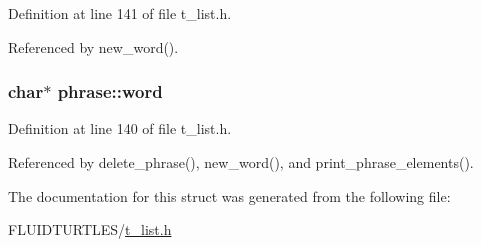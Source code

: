 Definition at line 141 of file t\-\_\-list.\-h.



Referenced by new\-\_\-word().

\hypertarget{structphrase_a119079f5098f2cc6637854413a6bc953}{
\subsubsection[{word}]{\setlength{\rightskip}{0pt plus 5cm}char$\ast$ phrase\-::word}}\label{structphrase_a119079f5098f2cc6637854413a6bc953}


Definition at line 140 of file t\-\_\-list.\-h.



Referenced by delete\-\_\-phrase(), new\-\_\-word(), and print\-\_\-phrase\-\_\-elements().



The documentation for this struct was generated from the following file\-:\begin{DoxyCompactItemize}
\item 
F\-L\-U\-I\-D\-T\-U\-R\-T\-L\-E\-S/\hyperlink{t__list_8h}{t\-\_\-list.\-h}\end{DoxyCompactItemize}
